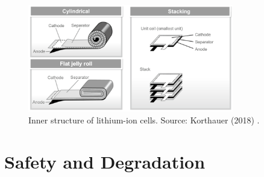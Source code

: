\begin{figure}[ht]
    \centering
    \includegraphics[width=0.8\textwidth]{Images/Chapter1/geometries.png}
    \caption[Inner structure of lithium-ion cells]{Inner structure of lithium-ion cells. Source: Korthauer (2018) \cite{korthauer2018lithium}.}
    \label{fig:geometries}
\end{figure}

\section{Safety and Degradation}
\label{sec:safety-degradation}


